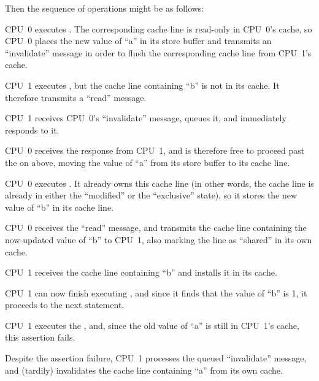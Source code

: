 Then the sequence of operations might be as follows:
\begin{fcvref}
\begin{sequence}
\item	CPU~0 executes .  The corresponding
	cache line is read-only in
	CPU~0's cache, so CPU~0 places the new value of ``a'' in its
	store buffer and transmits an ``invalidate'' message in order
	to flush the corresponding cache line from CPU~1's cache.
	\label{seq:app:whymb:Invalidate Queues and Memory Barriers}
\item	CPU~1 executes , but the cache line
	containing ``b'' is not in its cache.
	It therefore transmits a ``read'' message.
\item	CPU~1 receives CPU~0's ``invalidate'' message, queues it, and
	immediately responds to it.
\item	CPU~0 receives the response from CPU~1, and is therefore free
	to proceed past the  on  above, moving
	the value of ``a'' from its store buffer to its cache line.
\item	CPU~0 executes .
	It already owns this cache line (in other words, the cache line
	is already in either the ``modified'' or the ``exclusive'' state),
	so it stores the new value of ``b'' in its cache line.
\item	CPU~0 receives the ``read'' message, and transmits the
	cache line containing the now-updated value of ``b''
	to CPU~1, also marking the line as ``shared'' in its own cache.
\item	CPU~1 receives the cache line containing ``b'' and installs
	it in its cache.
\item	CPU~1 can now finish executing ,
	and since it finds that the value of ``b'' is 1, it proceeds
	to the next statement.
\item	CPU~1 executes the , and, since the
	old value of ``a'' is still in CPU~1's cache,
	this assertion fails.
\item	Despite the assertion failure, CPU~1 processes the queued
	``invalidate'' message, and (tardily)
	invalidates the cache line containing ``a'' from its own cache.
\end{sequence}
\end{fcvref}

\QuickQuizEnd

